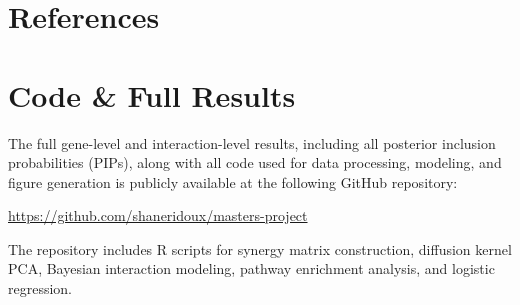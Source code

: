 \documentclass{article}\usepackage[]{graphicx}\usepackage[]{color}
\begin{document}
% 





\newpage
\section{References}
\label{sec:ref}


\appendix
% 

\section{Code \& Full Results}
\label{sec:code}

The full gene-level and interaction-level results, including all posterior inclusion probabilities (PIPs), along with all code used for data processing, modeling, and figure generation is publicly available at the following GitHub repository:

\begin{center}
\url{https://github.com/shaneridoux/masters-project}
\end{center}

The repository includes R scripts for synergy matrix construction, diffusion kernel PCA, Bayesian interaction modeling, pathway enrichment analysis, and logistic regression.
\end{document}

